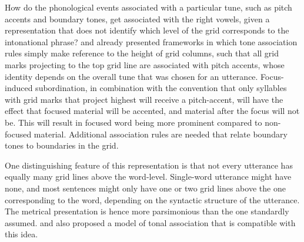 \documentclass[preprint,review,12pt,authoryear,times]{elsarticle}
\begin{document}


How do the phonological events associated with a particular tune, such as pitch accents and boundary tones, get associated with the right vowels, given a representation that does not identify which level of the grid corresponds to the intonational phrase? \citet{liber75} and \citet{pierr80} already presented frameworks in which tone association rules simply make reference to the height of grid columns, such that all grid marks projecting to the top grid line are associated with pitch accents, whose identity depends on the overall tune that was chosen for an utterance. Focus-induced subordination, in combination with the convention that only syllables with grid marks that project highest will receive a pitch-accent, will have the effect that focused material will be accented, and material after the focus will not be. This will result in focused word being more prominent compared to non-focused material. Additional association rules are needed that relate boundary tones to boundaries in the grid. 

One distinguishing feature of this representation is that not every utterance has equally many grid lines above the word-level. Single-word utterance might have none, and most sentences might only have one or two grid lines above the one corresponding to the word, depending on the syntactic structure of the utterance. The metrical presentation is hence more parsimonious than the one standardly assumed. \citet{gusse90} and \citet{gusse92b} also proposed a model of tonal association that is compatible with this idea.
\end{document}
